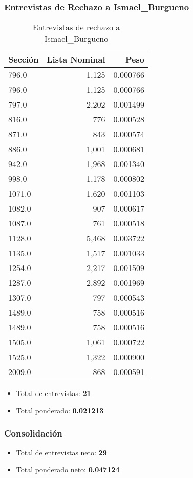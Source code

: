 \documentclass[a4paper,12pt]{article}
\begin{document}
\subsubsection*{Entrevistas de Rechazo a Ismael_Burgueno}
\begin{table}[h]
\centering
\begin{tabular}{lrr}
\toprule
Sección & Lista Nominal & Peso \\ \midrule
796.0 & 1,125 & 0.000766 \\ 
796.0 & 1,125 & 0.000766 \\ 
797.0 & 2,202 & 0.001499 \\ 
816.0 & 776 & 0.000528 \\ 
871.0 & 843 & 0.000574 \\ 
886.0 & 1,001 & 0.000681 \\ 
942.0 & 1,968 & 0.001340 \\ 
998.0 & 1,178 & 0.000802 \\ 
1071.0 & 1,620 & 0.001103 \\ 
1082.0 & 907 & 0.000617 \\ 
1087.0 & 761 & 0.000518 \\ 
1128.0 & 5,468 & 0.003722 \\ 
1135.0 & 1,517 & 0.001033 \\ 
1254.0 & 2,217 & 0.001509 \\ 
1287.0 & 2,892 & 0.001969 \\ 
1307.0 & 797 & 0.000543 \\ 
1489.0 & 758 & 0.000516 \\ 
1489.0 & 758 & 0.000516 \\ 
1505.0 & 1,061 & 0.000722 \\ 
1525.0 & 1,322 & 0.000900 \\ 
2009.0 & 868 & 0.000591 \\ 
\bottomrule
\end{tabular}
\caption{Entrevistas de rechazo a Ismael_Burgueno}
\end{table}

\begin{itemize}
\item Total de entrevistas: \textbf{21}
\item Total ponderado: \textbf{0.021213}
\end{itemize}

\subsubsection*{Consolidación}
\begin{itemize}
\item Total de entrevistas neto: \textbf{29}
\item Total ponderado neto: \textbf{0.047124}
\end{itemize}
\end{document}

